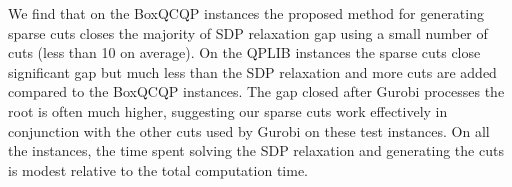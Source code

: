 \documentclass[twoside]{article}
\newcommand{\ns}[1]{\makebox[2em][r]{\,(#1)}}   %
\newcommand{\oo}[1]{{\textcolor{blue}{#1}}}
\newcommand{\ooc}[1]{{ \oo{[OG comment: #1}]}}
\begin{document}
	
	We find that on the BoxQCQP instances the proposed method for generating sparse cuts closes the majority of SDP relaxation gap using a small number of cuts (less than 10 on average).  On the QPLIB instances the sparse cuts close significant gap but much less than the SDP relaxation and more cuts are added compared to the BoxQCQP instances. The gap closed after Gurobi processes the root is often much higher, suggesting our sparse cuts work effectively in conjunction with the other cuts used by Gurobi on these test instances. On all the instances, the time spent solving the SDP relaxation and generating the cuts is modest relative to the total computation time.
	
\end{document}
